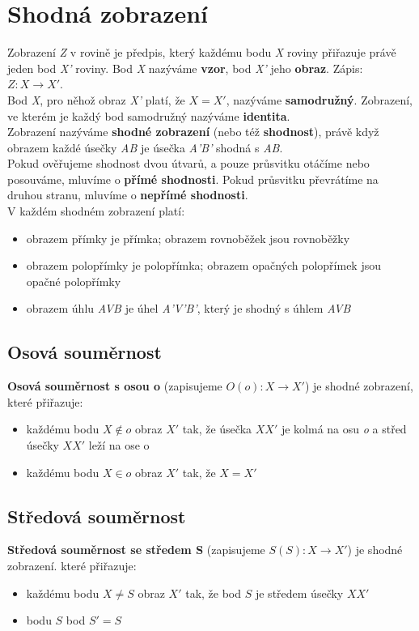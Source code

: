 \documentclass[12pt, a4paper]{article}
\begin{document}
\section{Shodná zobrazení}

Zobrazení \textit{Z} v rovině je předpis, který každému bodu \textit{X} roviny přiřazuje právě jeden bod \textit{X'} roviny. Bod \textit{X} nazýváme \textbf{vzor}, bod \textit{X'} jeho \textbf{obraz}. Zápis: $Z: X \rightarrow X'$.\\
Bod \textit{X}, pro něhož obraz \textit{X'} platí, že $X = X'$, nazýváme \textbf{samodružný}. Zobrazení, ve kterém je každý bod samodružný nazýváme \textbf{identita}.\\

Zobrazení nazýváme \textbf{shodné zobrazení} (nebo též \textbf{shodnost}), právě když obrazem každé úsečky \textit{AB} je úsečka \textit{A'B'} shodná s \textit{AB}.\\
Pokud ověřujeme shodnost dvou útvarů, a pouze průsvitku otáčíme nebo posouváme, mluvíme o \textbf{přímé shodnosti}. Pokud průsvitku převrátíme na druhou stranu, mluvíme o
\textbf{nepřímé shodnosti}.\\
V každém  shodném zobrazení platí:\\
\begin{itemize}
\item obrazem přímky je přímka; obrazem rovnoběžek jsou rovnoběžky
\item obrazem polopřímky je polopřímka; obrazem opačných polopřímek jsou opačné polopřímky
\item obrazem úhlu \textit{AVB} je úhel \textit{A'V'B'}, který je shodný s úhlem \textit{AVB}
\end{itemize}

\subsection*{Osová souměrnost}
\textbf{Osová souměrnost s osou o} (zapisujeme $O(o): X \rightarrow X'$) je shodné zobrazení, které přiřazuje:\\
\begin{itemize}
\item každému bodu $X \notin o$ obraz $X'$ tak, že úsečka $XX'$ je kolmá na osu \textit{o} a střed úsečky $XX'$ leží na ose o
\item každému bodu $X \in o$ obraz $X'$ tak, že $X = X'$
\end{itemize}

\subsection*{Středová souměrnost}
\textbf{Středová souměrnost se středem S} (zapisujeme $S(S): X \rightarrow X'$) je shodné zobrazení. které přiřazuje:\\
\begin{itemize}
\item každému bodu $X \neq S$ obraz $X'$ tak, že bod $S$ je středem úsečky $XX'$
\item bodu $S$ bod $S'=S$
\end{itemize}
\end{document}
